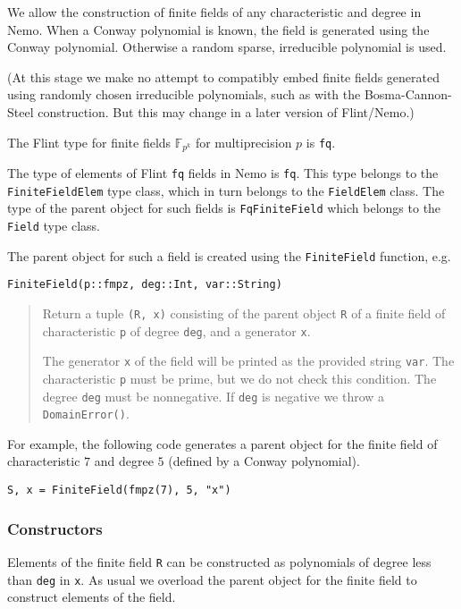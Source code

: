 \documentclass[a4paper,10pt]{article}
\newcommand{\F}{\mathbb{F}}
\newcommand{\code}{\lstinline}
\newcommand{\desc}[1]{\vspace{-3mm}\begin{quote}#1\end{quote}}
\begin{document}
{{We allow the construction of finite fields of any characteristic and degree in
Nemo. When a Conway polynomial is known, the field is generated using the 
Conway polynomial. Otherwise a random sparse, irreducible polynomial is used. 

(At this stage we make no attempt to compatibly embed finite fields generated 
using randomly chosen irreducible polynomials, such as with the 
Bosma-Cannon-Steel construction. But this may change in a later version of 
Flint/Nemo.) 

The Flint type for finite fields $\F_{p^k}$ for multiprecision $p$ is
\code{fq}.

The type of elements of Flint \code{fq} fields in Nemo is \code{fq}.
This type belongs to the \code{FiniteFieldElem} type class, which in turn belongs
to the \code{FieldElem} class. The type of the parent object for such fields is
\code{FqFiniteField} which belongs to the \code{Field} type class.

The parent object for such a field is created using the \code{FiniteField}
function, e.g.

\begin{lstlisting}
FiniteField(p::fmpz, deg::Int, var::String)
\end{lstlisting}

\desc{Return a tuple \code{(R, x)} consisting of the parent object \code{R} of
a finite field of characteristic \code{p} of degree \code{deg}, and a
generator \code{x}. 

The generator \code{x} of the field will be printed as the provided string
\code{var}. The characteristic \code{p} must be prime, but we do not check this
condition. The degree \code{deg} must be nonnegative. If \code{deg} is negative
we throw a \code{DomainError()}.}

For example, the following code generates a parent object for the finite field
of characteristic $7$ and degree $5$ (defined by a Conway polynomial).

\begin{lstlisting}
S, x = FiniteField(fmpz(7), 5, "x")
\end{lstlisting}

\subsubsection{Constructors}

Elements of the finite field \code{R} can be constructed as polynomials of
degree less than \code{deg} in \code{x}. As usual we overload the parent object
for the finite field to construct elements of the field.

}}
\end{document}

